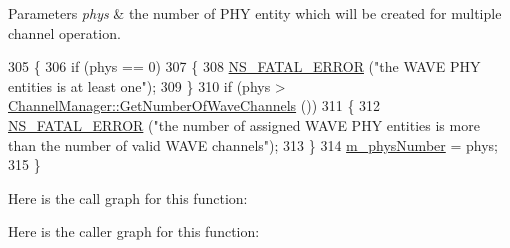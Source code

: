 \begin{DoxyParams}{Parameters}
{\em phys} & the number of P\+HY entity which will be created for multiple channel operation. \\
\hline
\end{DoxyParams}

\begin{DoxyCode}
305 \{
306   \textcolor{keywordflow}{if} (phys == 0)
307     \{
308       \hyperlink{group__fatal_ga5131d5e3f75d7d4cbfd706ac456fdc85}{NS\_FATAL\_ERROR} (\textcolor{stringliteral}{"the WAVE PHY entities is at least one"});
309     \}
310   \textcolor{keywordflow}{if} (phys > \hyperlink{classns3_1_1ChannelManager_a40722c6f8946e1e3952c0688d633f275}{ChannelManager::GetNumberOfWaveChannels} ())
311     \{
312       \hyperlink{group__fatal_ga5131d5e3f75d7d4cbfd706ac456fdc85}{NS\_FATAL\_ERROR} (\textcolor{stringliteral}{"the number of assigned WAVE PHY entities is more than the number of
       valid WAVE channels"});
313     \}
314   \hyperlink{classns3_1_1WaveHelper_a34634d5d3480ffdd4b9ecaa375d2888f}{m\_physNumber} = phys;
315 \}
\end{DoxyCode}


Here is the call graph for this function\+:




Here is the caller graph for this function\+:


